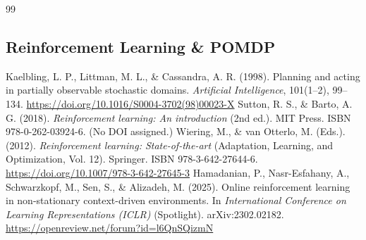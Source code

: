 \documentclass[11pt]{article}
\begin{document}
\begin{thebibliography}{99}
\subsection{Reinforcement Learning \& POMDP}
 Kaelbling, L. P., Littman, M. L., \& Cassandra, A. R. (1998). Planning and acting in partially observable stochastic domains. \textit{Artificial Intelligence}, 101(1--2), 99--134. \url{https://doi.org/10.1016/S0004-3702(98)00023-X}
 Sutton, R. S., \& Barto, A. G. (2018). \textit{Reinforcement learning: An introduction} (2nd ed.). MIT Press. ISBN 978-0-262-03924-6. (No DOI assigned.)
 Wiering, M., \& van Otterlo, M. (Eds.). (2012). \textit{Reinforcement learning: State-of-the-art} (Adaptation, Learning, and Optimization, Vol. 12). Springer. ISBN 978-3-642-27644-6. \url{https://doi.org/10.1007/978-3-642-27645-3}
 Hamadanian, P., Nasr-Esfahany, A., Schwarzkopf, M., Sen, S., \& Alizadeh, M. (2025). Online reinforcement learning in non-stationary context-driven environments. In \textit{International Conference on Learning Representations (ICLR)} (Spotlight). arXiv:2302.02182. \url{https://openreview.net/forum?id=l6QnSQizmN}
\end{thebibliography}
\end{document}
